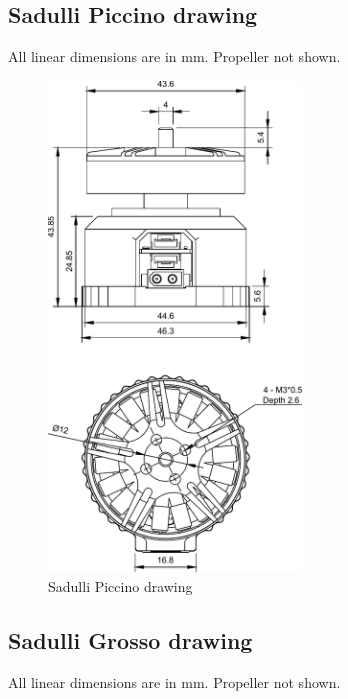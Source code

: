 \newpage

\subsection{Sadulli Piccino drawing}
All linear dimensions are in mm. Propeller not shown.

\begin{figure}[!hbt]
    \centerline{\includegraphics[width=0.6\textwidth]{figures/sadulli_piccino}}
    \caption{Sadulli Piccino drawing\label{Piccino_drawing}}
\end{figure}

\newpage

\subsection{Sadulli Grosso drawing}
All linear dimensions are in mm. Propeller not shown.


